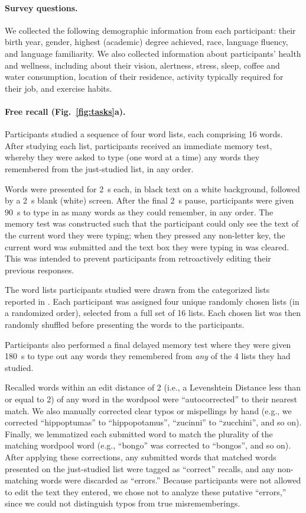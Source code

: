 \documentclass[10pt]{article}
\begin{document}
\paragraph*{Survey questions.}  We collected the following demographic
information from each participant: their birth year, gender, highest
(academic) degree achieved, race, language fluency, and language
familiarity.  We also collected information about participants'
health and wellness, including about their vision, alertness, stress, sleep, coffee
and water consumption, location of their residence, activity typically
required for their job, and exercise habits.


\paragraph*{Free recall (Fig.~\ref{fig:tasks}a).} 
Participants studied a sequence of four word lists, each comprising 16
words.  After studying each list, participants received an immediate
memory test, whereby they were asked to type (one word at a time) any
words they remembered from the just-studied list, in any order.

Words were presented for 2~s each, in black text on a white
background, followed by a 2~s blank (white) screen.  After the final
2~s pause, participants were given 90~s to type in as many words as
they could remember, in any order.  The memory test was constructed
such that the participant could only see the text of the current word
they were typing; when they pressed any non-letter key, the current
word was submitted and the text box they were typing in was cleared.
This was intended to prevent participants from retroactively editing
their previous responses.

The word lists participants studied were drawn from the categorized
lists reported in \cite{ZimaEtal18}.  Each participant was assigned
four unique randomly chosen lists (in a randomized order), selected from a full set of 16
lists.  Each chosen list was then randomly shuffled before presenting
the words to the participants.

Participants also performed a final delayed memory test where they
were given 180~s to type out any words they remembered from
\textit{any} of the 4 lists they had studied.

Recalled words within an edit distance of 2 (i.e., a Levenshtein Distance less
than or equal to 2) of any word in the wordpool were ``autocorrected''
to their nearest match.  We also manually corrected clear typos or
mispellings by hand (e.g., we corrected ``hippoptumas'' to
``hippopotamus'', ``zucinni'' to ``zucchini'', and so on).  Finally,
we lemmatized each submitted word to match the plurality of the
matching wordpool word (e.g., ``bongo'' was corrected to ``bongos'',
and so on).  After applying these corrections, any submitted words
that matched words presented on the just-studied list were tagged as
``correct'' recalls, and any non-matching words were discarded as
``errors.''  Because participants were not allowed to edit the text
they entered, we chose not to analyze these putative ``errors,'' since
we could not distinguish typos from true misrememberings.
\end{document}
